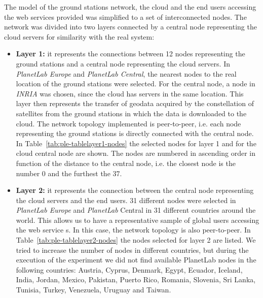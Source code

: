 The model of the ground stations network, the cloud and the end users accessing
the web services provided was simplified to a set of interconnected nodes. The
network was divided into two layers connected by a central node representing the
cloud servers for similarity with the real system:
\begin{itemize}

\item \textbf{Layer 1:} it represents the connections between 12 nodes
  representing the ground stations and a central node representing the cloud
  servers. In \emph{PlanetLab Europe} and \emph{PlanetLab Central}, the nearest nodes to the
  real location of the ground stations were selected. For the central node, a
  node in \emph{INRIA} was chosen, since the \bonfire cloud has servers in the same
  location. This layer then represents the transfer of geodata acquired by the
  constellation of satellites from the ground stations in which the data is
  downloaded to the cloud. The network topology implemented is peer-to-peer,
  i.e. each node representing the ground stations is directly connected with the
  central node. In Table~\ref{tab:ple-tablelayer1-nodes} the \pl selected nodes for layer 1 and for the
  cloud central node are shown. The nodes are numbered in ascending order in
  function of the distance to the central node, i.e. the closest node is the
  number 0 and the furthest the 37.

%   


\item \textbf{Layer 2:} it represents the connection between the central node
  representing the cloud servers and the end users. 31 different nodes were
  selected in \emph{PlanetLab Europe} and \emph{PlanetLab} Central in 31 different countries
  around the world. This allows us to have a representative sample of global
  users accessing the web service
s. In this case, the network topology is also peer-to-peer. In Table~\ref{tab:ple-tablelayer2-nodes} the nodes selected for layer 2 are listed. We tried to increase the number of nodes in different countries, but during the execution of the experiment we did not find available PlanetLab nodes in the following countries: Austria, Cyprus, Denmark, Egypt, Ecuador, Iceland, India, Jordan, Mexico, Pakistan, Puerto Rico, Romania, Slovenia, Sri Lanka, Tunisia, Turkey, Venezuela, Uruguay and Taiwan.
\end{itemize}


